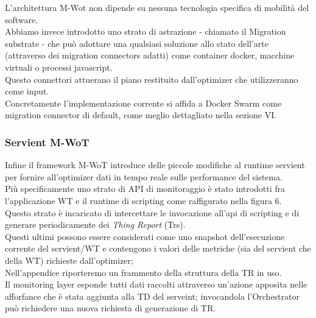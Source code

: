 \documentclass[11pt]{article}
\begin{document}
		L'architettura M-Wot non dipende su nessuna tecnologia specifica di mobilità del software. \\
		Abbiamo invece introdotto uno strato di astrazione - chiamato il Migration substrate - che può adottare una qualsiasi soluzione allo stato dell'arte (attraverso dei migration connectors adatti) come container docker, macchine virtuali o processi javascript. \\
		Questo connettori attuerano il piano restituito dall'optimizer che utilizzeranno come input.\\
		Concretamente l'implementazione corrente si affida a Docker Swarm come migration connector di default, come meglio dettagliato nella sezione VI.
		
		\subsubsection{Servient M-WoT}
		Infine il framework M-WoT introduce delle piccole modifiche al runtime servient per fornire all'optimizer dati in tempo reale sulle performance del sistema. \\
		Più specificamente uno strato di API di monitoraggio è stato introdotti fra l'applicazione WT e il runtime di scripting come raffigurato nella figura 6.\\
		Questo strato è incaricato di intercettare le invocazione all'api di scripting e di generare periodicamente dei \textit{Thing Report} (Trs). \\
		Questi ultimi possono  essere considerati come uno snapshot dell'esecuzione corrente del servient/WT e contengono i valori delle metriche (sia del servient che della WT) richieste dall'optimizer; \\
		Nell'appendice riporteremo un frammento della struttura della TR in uso. \\
		Il monitoring layer esponde tutti dati raccolti attraverso un'azione apposita nelle afforfance che è stata aggiunta alla TD del serveint; invocandola l'Orchestrator può richiedere una nuova richiesta di generazione di TR. \\
		
\end{document}

